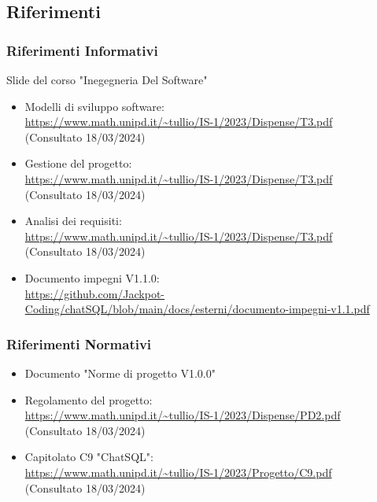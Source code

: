 \documentclass[5pt]{article}
\begin{document}
  \subsection{Riferimenti}
    \subsubsection{Riferimenti Informativi}
      Slide del corso "Inegegneria Del Software"
      \begin{itemize}
            \item Modelli di sviluppo software: \\ \url{https://www.math.unipd.it/~tullio/IS-1/2023/Dispense/T3.pdf}\\
            (Consultato 18/03/2024)
            \item Gestione del progetto: \\
            \url{https://www.math.unipd.it/~tullio/IS-1/2023/Dispense/T3.pdf}\\
            (Consultato 18/03/2024)
            \item Analisi dei requisiti: \\
            \url{https://www.math.unipd.it/~tullio/IS-1/2023/Dispense/T3.pdf}\\
            (Consultato 18/03/2024)
            \item Documento impegni V1.1.0: \\
            \url{https://github.com/Jackpot-Coding/chatSQL/blob/main/docs/esterni/documento-impegni-v1.1.pdf}\\
      \end{itemize}
    \subsubsection{Riferimenti Normativi}
      \begin{itemize}
            \item Documento "Norme di progetto V1.0.0"
            \item Regolamento del progetto: \\ \url{https://www.math.unipd.it/~tullio/IS-1/2023/Dispense/PD2.pdf}\\
            (Consultato 18/03/2024)
            \item Capitolato C9 "ChatSQL": \\
            \url{https://www.math.unipd.it/~tullio/IS-1/2023/Progetto/C9.pdf}\\
            (Consultato 18/03/2024)
      \end{itemize}
\end{document}
